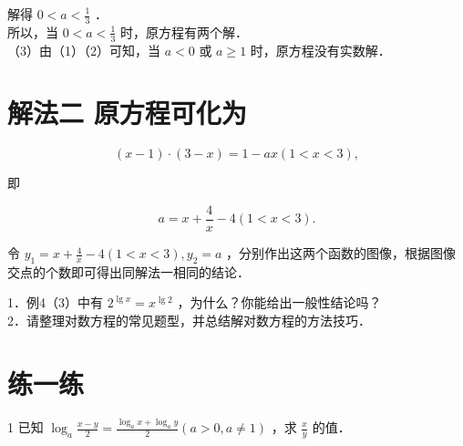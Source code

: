 \documentclass[10pt]{article}
\begin{document}
解得 \(0<a<\frac{1}{3}\) ．\\
所以，当 \(0<a<\frac{1}{3}\) 时，原方程有两个解．\\
（3）由（1）（2）可知，当 \(a<0\) 或 \(a \geqslant 1\) 时，原方程没有实数解．

\section*{解法二 原方程可化为}
\[
(x-1) \cdot(3-x)=1-a x(1<x<3),
\]

即

\[
a=x+\frac{4}{x}-4(1<x<3) .
\]

令 \(y_{1}=x+\frac{4}{x}-4(1<x<3), y_{2}=a\) ，分别作出这两个函数的图像，根据图像交点的个数即可得出同解法一相同的结论．

1．例4（3）中有 \(2^{\lg x}=x^{\lg 2}\) ，为什么？你能给出一般性结论吗？\\
2．请整理对数方程的常见题型，并总结解对数方程的方法技巧．

\section*{练一练}
1 已知 \(\log _{a} \frac{x-y}{2}=\frac{\log _{a} x+\log _{a} y}{2}(a>0, a \neq 1)\) ，求 \(\frac{x}{y}\) 的值．
\end{document}

